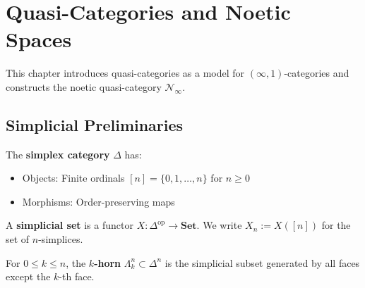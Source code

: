 

\chapter{Quasi-Categories and Noetic Spaces}
\label{ch:quasi-categories}

\begin{tcolorbox}[colback=blue!5!white,colframe=blue!75!black,title=\vnewfour]
This chapter introduces quasi-categories as a model for $(\infty,1)$-categories
and constructs the noetic quasi-category $\mathcal{N}_\infty$.
\end{tcolorbox}

\section{Simplicial Preliminaries}

\begin{definition}
\label{def:simplex-cat}
The \textbf{simplex category} $\Delta$ has:
\begin{itemize}
  \item Objects: Finite ordinals $[n] = \{0, 1, \ldots, n\}$ for $n \geq 0$
  \item Morphisms: Order-preserving maps
\end{itemize}
\end{definition}

\begin{definition}
\label{def:simplicial-set}
A \textbf{simplicial set} is a functor $X : \Delta^{\mathrm{op}} \to \mathbf{Set}$.
We write $X_n := X([n])$ for the set of $n$-simplices.
\end{definition}

\begin{definition}[Horn]
\label{def:horn}
For $0 \leq k \leq n$, the \textbf{$k$-horn} $\Lambda^n_k \subset \Delta^n$ is the
simplicial subset generated by all faces except the $k$-th face.
\end{definition}

